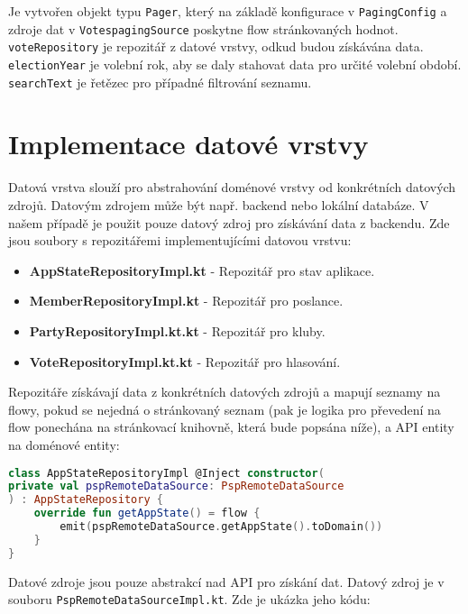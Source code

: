 \noindent Je vytvořen objekt typu \lstinline|Pager|, který na základě konfigurace v \lstinline|PagingConfig| a zdroje dat \linebreak v \lstinline|VotespagingSource| poskytne flow stránkovaných hodnot.  \lstinline|voteRepository| je repozitář z datové vrstvy, odkud budou získávána data. \lstinline|electionYear| je volební rok, aby se daly stahovat data pro určité volební období. \lstinline|searchText| je řetězec pro případné filtrování seznamu.

\section {Implementace datové vrstvy}
Datová vrstva slouží pro abstrahování doménové vrstvy od konkrétních datových zdrojů. Datovým zdrojem může být např. backend nebo lokální databáze. V našem případě je použit pouze datový zdroj pro získávání data z backendu. Zde jsou soubory s repozitářemi implementujícími datovou vrstvu:

\begin{itemize}
	\item \textbf{AppStateRepositoryImpl.kt} - Repozitář pro stav aplikace.
	\item \textbf{MemberRepositoryImpl.kt} - Repozitář pro poslance.
	\item \textbf{PartyRepositoryImpl.kt.kt} - Repozitář pro kluby.
	\item \textbf{VoteRepositoryImpl.kt.kt} - Repozitář pro hlasování.
\end{itemize}

\noindent Repozitáře získávají data z konkrétních datových zdrojů a mapují seznamy na flowy, pokud se nejedná o stránkovaný seznam (pak je logika pro převedení na flow ponechána na stránkovací knihovně, která bude popsána níže), a API entity na doménové entity:

\begin{lstlisting}[caption={Ukázka datové vrstvy pro data o stavu aplikace}, label={lst:use-case-repository}, tabsize=2, language=Kotlin]
class AppStateRepositoryImpl @Inject constructor(
private val pspRemoteDataSource: PspRemoteDataSource
) : AppStateRepository {
	override fun getAppState() = flow { 			
		emit(pspRemoteDataSource.getAppState().toDomain()) 
	}
}
\end{lstlisting}

\noindent Datové zdroje jsou pouze abstrakcí nad API pro získání dat. Datový zdroj je v souboru \linebreak \lstinline|PspRemoteDataSourceImpl.kt|. Zde je ukázka jeho kódu:


